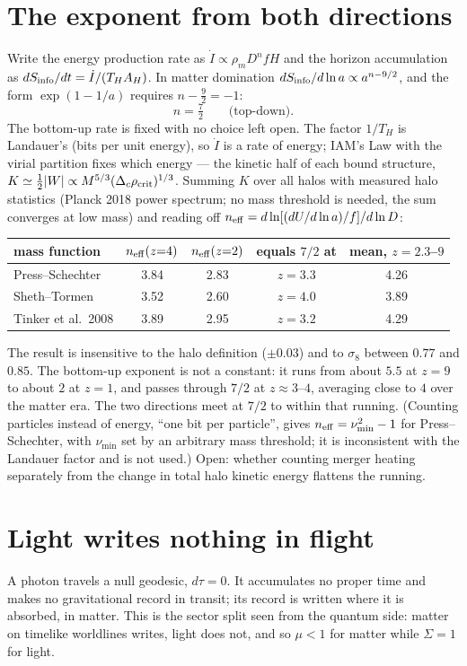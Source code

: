 \section{The exponent from both directions}
Write the energy production rate as $\dot I\propto\rho_mD^nfH$ and the horizon accumulation as $dS_{\rm info}/dt=\dot I/(T_HA_H)$. In matter domination
$dS_{\rm info}/d\ln a\propto a^{n-9/2}$, and the form $\exp(1-1/a)$ requires $n-\tfrac92=-1$:
\begin{equation}n=\tfrac72\qquad\text{(top-down).}\end{equation}
The bottom-up rate is fixed with no choice left open. The factor $1/T_H$ is Landauer's (bits per unit energy), so $\dot I$ is a rate of energy; IAM's Law
with the virial partition fixes which energy --- the kinetic half of each bound structure, $K\simeq\tfrac12|W|\propto M^{5/3}(\Delta_c\rho_{\rm crit})^{1/3}$.
Summing $K$ over all halos with measured halo statistics (Planck 2018 power spectrum; no mass threshold is needed, the sum converges at low mass) and
reading off $n_{\rm eff}=d\ln[(dU/d\ln a)/f]/d\ln D$:
\begin{center}\small\begin{tabular}{lcccc}\toprule
mass function & $n_{\rm eff}(z{=}4)$ & $n_{\rm eff}(z{=}2)$ & equals $7/2$ at & mean, $z=2.3$--$9$\\\midrule
Press--Schechter & 3.84 & 2.83 & $z=3.3$ & 4.26\\ Sheth--Tormen & 3.52 & 2.60 & $z=4.0$ & 3.89\\ Tinker et al.\ 2008 & 3.89 & 2.95 & $z=3.2$ & 4.29\\\bottomrule
\end{tabular}\end{center}
The result is insensitive to the halo definition ($\pm0.03$) and to $\sigma_8$ between $0.77$ and $0.85$. The bottom-up exponent is not a constant: it
runs from about $5.5$ at $z=9$ to about $2$ at $z=1$, and passes through $7/2$ at $z\approx3$--$4$, averaging close to $4$ over the matter era. The two
directions meet at $7/2$ to within that running. (Counting particles instead of energy, ``one bit per particle'', gives $n_{\rm eff}=\nu_{\min}^2-1$ for
Press--Schechter, with $\nu_{\min}$ set by an arbitrary mass threshold; it is inconsistent with the Landauer factor and is not used.) Open: whether
counting merger heating separately from the change in total halo kinetic energy flattens the running.

\section{Light writes nothing in flight}
A photon travels a null geodesic, $d\tau=0$. It accumulates no proper time and makes no gravitational record in transit; its record is written where it
is absorbed, in matter. This is the sector split seen from the quantum side: matter on timelike worldlines writes, light does not, and so $\mu<1$ for
matter while $\Sigma=1$ for light.

